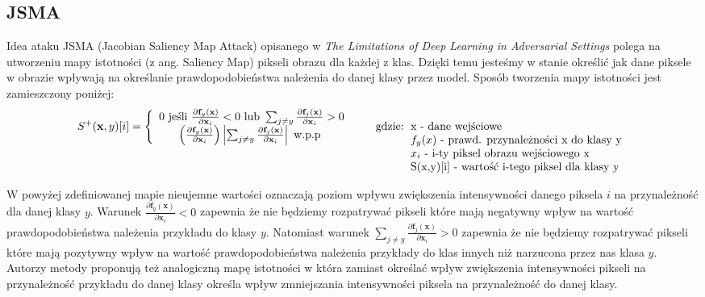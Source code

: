 \documentclass{article}
\begin{document}
\subsection{JSMA}
Idea ataku JSMA (Jacobian Saliency Map Attack) opisanego w
\textit{The Limitations of Deep Learning in Adversarial Settings}\cite{DBLP:journals/corr/PapernotMJFCS15}
polega na utworzeniu mapy istotności (z ang. Saliency Map) pikseli obrazu dla każdej z klas.
Dzięki temu jesteśmy w stanie określić jak dane piksele w obrazie wpływają na określanie prawdopodobieństwa należenia
do danej klasy przez model. Sposób tworzenia mapy istotności jest zamieszczony poniżej:
\begin{equation}\label{jsma+}
S^{+} ( \mathbf { x } , y ) [ i ] = \left\{ \begin{array} { c } { 0 \text { jeśli } \frac { \partial \mathbf {f} _ { y } ( \mathbf {x} ) } { \partial \mathbf {x} _ { i } } < 0 \text { lub } \sum _ { j \neq y } \frac { \partial \mathbf {f} _ { j } ( \mathbf {x} ) } { \partial \mathbf {x} _ { i } } > 0 } \\ { \left( \frac { \partial \mathbf {f} _ { y } ( \mathbf {x} ) } { \partial \mathbf {x} _ { i } } \right) \left| \sum _ { j \neq y } \frac { \partial \mathbf {f} _ { j } ( \mathbf {x} ) } { \partial \mathbf {x} _ { i } } \right| \text { w.p.p } } \end{array} \right.
\qquad\text{gdzie:}
\begin{tabular}[t]{ll}
x - dane wejściowe \\
${f} _ { y } ({x})$ - prawd. przynależności x do klasy y \\
$x_{i}$ - i-ty piksel obrazu wejściowego x \\
S({x},y)[i] - wartość i-tego piksel dla klasy y
\end{tabular}
\end{equation}

W powyżej zdefiniowanej mapie nieujemne wartości oznaczają poziom wpływu zwiększenia intensywności danego piksela $i$
na przynależność dla danej klasy $y$.
Warunek $\frac { \partial \mathbf {f} _ { y } ( \mathbf {x} ) } { \partial \mathbf {x} _ { i } } < 0$
zapewnia że nie będziemy rozpatrywać pikseli które mają negatywny wpływ na wartość prawdopodobieństwa należenia przykładu
do klasy $y$.
Natomiast warunek $\sum _ { j \neq y } \frac { \partial \mathbf {f} _ { j } ( \mathbf {x} ) } { \partial \mathbf {x} _ { i } } > 0 $
zapewnia że nie będziemy rozpatrywać pikseli które mają pozytywny wpływ na wartość prawdopodobieństwa należenia przykłady do klas
innych niż narzucona przez nas klasa $y$. Autorzy metody proponują też analogiczną mapę istotności w która
zamiast określać wpływ zwiększenia intensywności pikseli na przynależność przykładu do danej klasy określa wpływ zmniejszania
intensywności piksela na przynależność do danej klasy.
\end{document}
